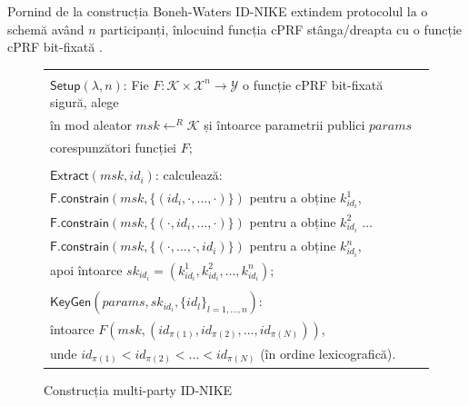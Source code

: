 \documentclass[oneside, 12pt]{book}
\begin{document}
Pornind de la construcția Boneh-Waters ID-NIKE extindem protocolul la o schemă având $n$ participanți, înlocuind funcția cPRF stânga/dreapta cu o funcție cPRF bit-fixată \cite{RD:2014}.

\begin{figure}[h!]

\begin{tabular}{|p{\textwidth}|}
\hline

\\
\hspace{.1in}
$\mathsf{Setup}(\lambda, n)$: Fie $F : \mathcal{K} \times \mathcal{X}^n \rightarrow \mathcal{Y}$ o funcție cPRF bit-fixată sigură, alege \\
	\hspace{.3in} în mod aleator $msk \leftarrow^R \mathcal{K}$ și întoarce parametrii publici $params$ \\ 
	\hspace{.3in} corespunzători funcției $F$; \\
\\
\hspace{.1in}
$\mathsf{Extract}(msk, id_i)$: calculează: \\
	\hspace{.3in} $\mathsf{F.constrain}(msk, \{(id_i, \cdot, \dots, \cdot)\})$ pentru a obține $k^1_{id_i}$, \\
	\hspace{.3in} $\mathsf{F.constrain}(msk, \{(\cdot, id_i, \dots, \cdot)\})$ pentru a obține $k^2_{id_i}$ $\dots$ \\
	\hspace{.3in} $\mathsf{F.constrain}(msk, \{(\cdot, \dots, \cdot, id_i)\})$ pentru a obține $k^n_{id_i}$, \\
	\hspace{.3in} apoi întoarce $sk_{id_i} = (k^{1}_{id_i}, k^{2}_{id_i}, \dots, k^{n}_{id_i})$; \\
\\
\hspace{.1in}
$\mathsf{KeyGen}(params, sk_{id_i},\{id_l\}_{l=1,\dots,n})$: \\
	\hspace{.3in} întoarce $F(msk, (id_{\pi(1)}, id_{\pi(2)}, \dots, id_{\pi(N)}))$,\\
	\hspace{.3in} unde $id_{\pi(1)} < id_{\pi(2)} < \dots < id_{\pi(N)}$ (în ordine lexicografică).

\\
\hline
\end{tabular}
\caption{Construcția multi-party ID-NIKE \cite{RD:2014}}
\label{fig:our-construction}
\end{figure}
\end{document}
